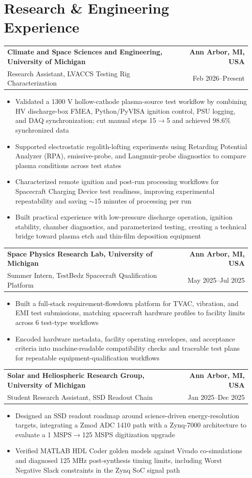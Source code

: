 \documentclass[10pt,a4paper]{article}
\makeatletter
\newcommand{\resumeSubheading}[4]{%
  \begin{tabular*}{\textwidth}{@{\extracolsep{\fill}}l r}
    \textbf{#1} & \textcolor{nameblue}{\textbf{#2}} \\
    #3 & #4
  \end{tabular*}\vspace{-2.0pt}
}
\newcommand{\resumeItemsStart}{\begin{itemize}}
\newcommand{\resumeItemsEnd}{\end{itemize}\vspace{-1.6pt}}
\newcommand{\resumeItem}[1]{\item #1}
\makeatother
\begin{document}
\section{Research \& Engineering Experience}

\resumeSubheading
  {Climate and Space Sciences and Engineering, University of Michigan}{Ann Arbor, MI, USA}
  {Research Assistant, LVACCS Testing Rig Characterization}{Feb 2026--Present}
\resumeItemsStart
  \resumeItem{Validated a 1300 V hollow-cathode plasma-source test workflow by combining HV discharge-box FMEA, Python/PyVISA ignition control, PSU logging, and DAQ synchronization; cut manual steps 15$\rightarrow$5 and achieved 98.6\% synchronized data}
  \resumeItem{Supported electrostatic regolith-lofting experiments using Retarding Potential Analyzer (RPA), emissive-probe, and Langmuir-probe diagnostics to compare plasma conditions across test states}
  \resumeItem{Characterized remote ignition and post-run processing workflows for Spacecraft Charging Device test readiness, improving experimental repeatability and saving $\sim$15 minutes of processing per run}
  \resumeItem{Built practical experience with low-pressure discharge operation, ignition stability, chamber diagnostics, and parameterized testing, creating a technical bridge toward plasma etch and thin-film deposition equipment}
\resumeItemsEnd

\resumeSubheading
  {Space Physics Research Lab, University of Michigan}{Ann Arbor, MI, USA}
  {Summer Intern, TestBedz Spacecraft Qualification Platform}{May 2025--Jul 2025}
\resumeItemsStart
  \resumeItem{Built a full-stack requirement-flowdown platform for TVAC, vibration, and EMI test submissions, matching spacecraft hardware profiles to facility limits across 6 test-type workflows}
  \resumeItem{Encoded hardware metadata, facility operating envelopes, and acceptance criteria into machine-readable compatibility checks and traceable test plans for repeatable equipment-qualification workflows}
\resumeItemsEnd

\resumeSubheading
  {Solar and Heliospheric Research Group, University of Michigan}{Ann Arbor, MI, USA}
  {Student Research Assistant, SSD Readout Chain}{Jan 2025--Dec 2025}
\resumeItemsStart
  \resumeItem{Designed an SSD readout roadmap around science-driven energy-resolution targets, integrating a Zmod ADC 1410 path with a Zynq-7000 architecture to evaluate a 1 MSPS$\rightarrow$125 MSPS digitization upgrade}
  \resumeItem{Verified MATLAB HDL Coder golden models against Vivado co-simulations and diagnosed 125 MHz post-synthesis timing limits, including Worst Negative Slack constraints in the Zynq SoC signal path}
\resumeItemsEnd
\end{document}
